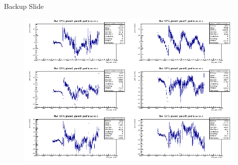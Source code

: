 \documentclass{beamer}[10pt]
\begin{document}
\begin{frame}{Backup Slide}
  
      \begin{figure}[H]
        \centering
        \includegraphics[width= \textwidth]{figures/pdf/plane0_prof_bias.png}
        \label{fig:enter-label}
    \end{figure}
  \end{frame}
\end{document}
